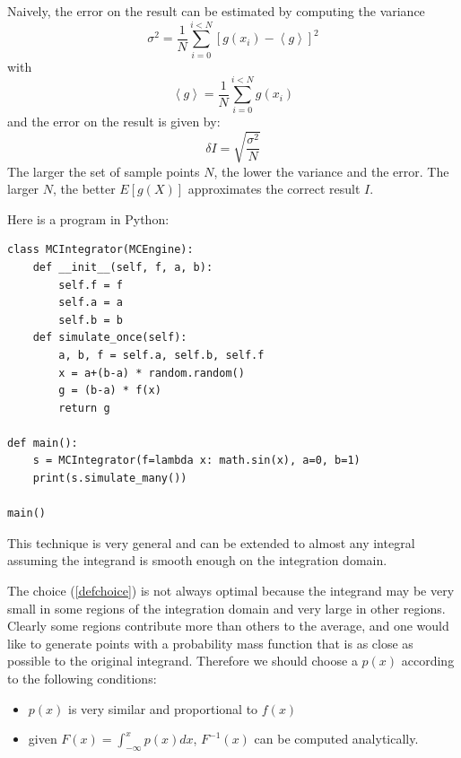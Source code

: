 \documentclass[justified, sixbynine]{tufte-book}
\def\ft{\small\tt}
\theoremstyle{plain}%
\newtheorem * {corollary}{Corollary}
\theoremstyle{definition}
\theoremstyle{remark}
\newtheorem * {remark}{Remark}
\newtheorem * {note}{Note}
\begin{document}
\begin{fullwidth}
Naively, the error on the result can be estimated by computing the variance
\begin{equation}
\sigma ^2 = \frac 1N\sum_{i=0}^{i<N}\left[ g(x_i)-\left\langle
g\right\rangle \right] ^2
\end{equation}
with
\begin{equation}
\left\langle g\right\rangle = \frac 1N\sum_{i=0}^{i<N}g(x_i)
\end{equation}
and the error on the result is given by:
\begin{equation}
\delta I=\sqrt{\frac{\sigma ^2}{N}}
\end{equation}
The larger the set of sample points $N$, the lower the variance and the
error. The larger $N$, the better $E[g(X)]$ approximates the correct result $%
I$.


Here is a program in Python:

\begin{lstlisting}[caption={in file: {\ft integrate.py}}]
class MCIntegrator(MCEngine):
    def __init__(self, f, a, b):
        self.f = f
        self.a = a
        self.b = b
    def simulate_once(self):
        a, b, f = self.a, self.b, self.f
        x = a+(b-a) * random.random()
        g = (b-a) * f(x)
        return g

def main():
    s = MCIntegrator(f=lambda x: math.sin(x), a=0, b=1)
    print(s.simulate_many())

main()
\end{lstlisting}

This technique is very general and can be extended to almost any integral
assuming the integrand is smooth enough on the integration domain.

The choice (\ref{defchoice}) is not always optimal because the integrand may
be very small in some regions of the integration domain and very large in
other regions. Clearly some regions contribute more than others to the
average, and one would like to generate points with a probability mass
function that is as close as possible to the original integrand. Therefore
we should choose a $p(x)$ according to the following conditions:

\begin{itemize}
\item  $p(x)$ is very similar and proportional to $f(x)$

\item  given $F(x)=\int_{-\infty }^xp(x)dx$, $F^{-1}(x)$ can be computed
analytically.
\end{itemize}


\end{fullwidth}
\end{document}
